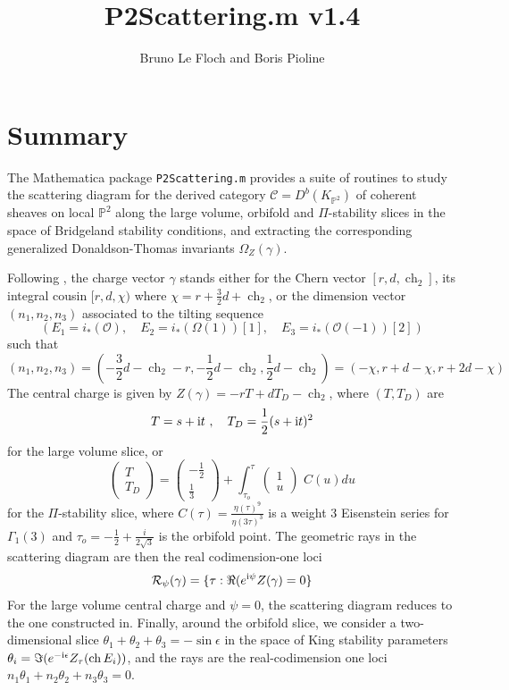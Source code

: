 \documentclass[12pt]{JHEP3}
\title{P2Scattering.m v1.4}
\author{Bruno Le Floch and Boris Pioline}
\newcommand{\cC}{\mathcal{C}}
\newcommand{\cO}{\mathcal{O}}
\newcommand{\IP}{\mathbb{P}}
\newcommand{\be}{\begin{equation}}
\newcommand{\ee}{\end{equation}}
\newcommand{\cR}{\mathcal{R}}
\newcommand{\I}{{\rm i}}
\DeclareMathOperator{\ch}{ch}
\begin{document}
\maketitle

\baselineskip 15pt

\tableofcontents

\medskip

\section{Summary}

The  {\sc Mathematica} package {\tt P2Scattering.m} provides a suite of routines to study
the scattering diagram for the derived category $\cC=D^b(K_{\IP^2})$ of coherent sheaves on 
local $\IP^2$ along the large volume, orbifold and  $\Pi$-stability slices in the space of Bridgeland stability conditions, and extracting the corresponding generalized Donaldson-Thomas invariants $\Omega_Z(\gamma)$. 

Following \cite{P2Global}, the charge vector $\gamma$ stands either for 
the Chern vector $[r,d,\ch_2]$, its integral cousin $[r,d,\chi)$ where $\chi=r+\frac32d+\ch_2$,
or the dimension vector $(n_1,n_2,n_3)$ associated to the tilting sequence 
\be
(E_1=i_*(\cO), \quad E_2=i_*(\Omega(1))[1], \quad E_3 = i_*(\cO(-1))[2])
\ee
such that
\be
(n_1,n_2,n_3) = (-\frac32 d-\ch_2-r,  -\frac12 d-\ch_2, \frac12 d-\ch_2) = (-\chi, r+d-\chi,r+2d-\chi)
\ee
The central charge is given by $Z(\gamma)=-r T + d T_D -\ch_2$, where $(T,T_D)$ are 
\be
T= s+\I t\ ,\quad T_D = \frac12 (s+\I t)^2 
\ee 
for the large volume slice, or 
\be
\label{Eichler0}
 \begin{pmatrix} T \\ T_D  \end{pmatrix}
= \begin{pmatrix} -\frac12 \\ \frac13  \end{pmatrix} 
+  \int_{\tau_o}^{\tau} \begin{pmatrix} 1 \\u \end{pmatrix} \, 
\, C(u)  du
\ee
for the $\Pi$-stability slice, where $C (\tau) = \frac{\eta(\tau)^9}{\eta(3\tau)^3}$ is a
weight 3 Eisenstein series for $\Gamma_1(3)$ and $\tau_o=-\frac12+\frac{i}{2\sqrt3}$ is 
the orbifold point. The geometric rays in the scattering diagram are then the real codimension-one 
loci 
\be
\cR_\psi(\gamma) = \{ \tau : \Re(e^{\I\psi} Z(\gamma)=0 \}
\ee
For the large volume central charge and $\psi=0$, the scattering diagram reduces to the one
constructed in\cite{Bousseau:2019ift}.
Finally, around the orbifold slice, we 
consider a two-dimensional slice $\theta_1+\theta_2+\theta_3=-\sin\epsilon$ in the
space of King stability parameters $\theta_i=\Im(e^{-\I\epsilon} Z_\tau(\ch E_i))$, and the rays are
the real-codimension one loci $n_1\theta_1+n_2\theta_2+n_3\theta_3=0$. 
\end{document}
